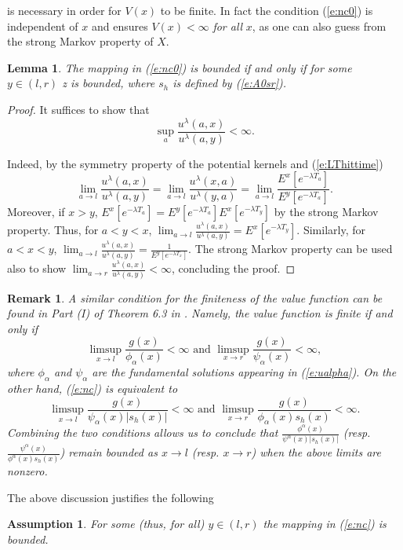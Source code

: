 \documentclass[11pt,reqno]{amsart}
\numberwithin{equation}{section}
\newtheorem{lemma}{Lemma}[section]
\newtheorem{remark}{Remark}[section]
\newtheorem{assumption}{Assumption}[section]
\def\rar{\rightarrow}
\begin{document}
\ee
is necessary in order for $V(x)$ to be finite. In fact the condition (\ref{e:nc0}) is independent of $x$ and ensures $V(x)<\infty$ {\em for all} $x$, as one can also guess from the strong Markov property of $X$.
\begin{lemma} \label{l:nc}
	The mapping in (\ref{e:nc0}) is bounded if and only if for some $y \in (l,r)$
	\be \label{e:nc}
	z \mapsto {}
	\ee
	is bounded, where $s_h$ is defined by (\ref{e:A0sr}).
\end{lemma}
\begin{proof}
	It suffices to show that
	\[
	\sup_a\frac{u^{\lambda}(a,x)}{u^{\lambda}(a,y)}<\infty.
	\]

Indeed, by the symmetry  property of the potential kernels and (\ref{e:LThittime})
\[
\lim_{a \rar l}\frac{u^{\lambda}(a,x)}{u^{\lambda}(a,y)}=\lim_{a \rar l}\frac{u^{\lambda}(x,a)}{u^{\lambda}(y,a)}=\lim_{a \rar l}\frac{E^x[e^{-\lambda T_a}]}{E^y[e^{-\lambda T_a}]}.
\]
Moreover, if $x>y$, $E^x[e^{-\lambda T_a}]=E^y[e^{-\lambda T_a}]E^x[e^{-\lambda T_y}]$ by the strong Markov property. Thus, for $a<y<x$, $\lim_{a \rar l}\frac{u^{\lambda}(a,x)}{u^{\lambda}(a,y)}=E^x[e^{-\lambda T_y}]$.
Similarly, for $a<x<y$, $\lim_{a \rar l}\frac{u^{\lambda}(a,x)}{u^{\lambda}(a,y)}=\frac{1}{E^y[e^{-\lambda T_x}]}$.
The strong Markov property can be used also to show $\lim_{a \rar r}\frac{u^{\lambda}(a,x)}{u^{\lambda}(a,y)}<\infty$, concluding the proof.
\end{proof}
\begin{remark}
	A similar condition for the finiteness of the value function can be found in Part (I) of Theorem 6.3 in \cite{LZ}. Namely, the value function is finite if and only if
	\[
	\limsup_{x \rar l} \frac{g(x)}{\phi_{\alpha}(x)}<\infty  \mbox{ and } \limsup_{x \rar r} \frac{g(x)}{\psi_{\alpha}(x)}<\infty,
	\]
	where $\phi_{\alpha}$ and $\psi_{\alpha}$ are the fundamental solutions appearing in (\ref{e:ualpha}). On the other hand, (\ref{e:nc}) is equivalent to
	\[
	\limsup_{x \rar l} \frac{g(x)}{\psi_{\alpha}(x)|s_h(x)|}<\infty  \mbox{ and } \limsup_{x \rar r} \frac{g(x)}{\phi_{\alpha}(x)s_h(x)}<\infty.
	\]
	Combining the two conditions allows us to conclude that  $\frac{\phi^{\alpha}(x)}{\psi^{\alpha}(x)|s_h(x)|}$ (resp. $\frac{\psi^{\alpha}(x)}{\phi^{\alpha}(x)s_h(x)}$) remain bounded as $x \rar l$ (resp. $x \rar r$) when the above limits are nonzero.
\end{remark}
The above discussion justifies the following
\begin{assumption} \label{a:OS}
	For some (thus, for all) $y\in (l,r)$  the mapping in (\ref{e:nc}) is bounded.
\end{assumption}
\end{document}
